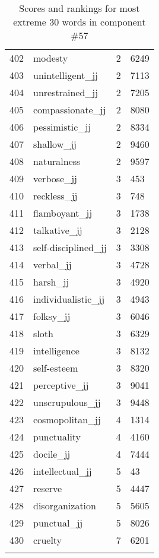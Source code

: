 \begin{longtable}[!htbp]{| rlr@{.}l |}
    402 & modesty & 2 & 6249 \\
    403 & unintelligent\_jj & 2 & 7113 \\
    404 & unrestrained\_jj & 2 & 7205 \\
    405 & compassionate\_jj & 2 & 8080 \\
    406 & pessimistic\_jj & 2 & 8334 \\
    407 & shallow\_jj & 2 & 9460 \\
    408 & naturalness & 2 & 9597 \\
    409 & verbose\_jj & 3 & 453 \\
    410 & reckless\_jj & 3 & 748 \\
    411 & flamboyant\_jj & 3 & 1738 \\
    412 & talkative\_jj & 3 & 2128 \\
    413 & self-disciplined\_jj & 3 & 3308 \\
    414 & verbal\_jj & 3 & 4728 \\
    415 & harsh\_jj & 3 & 4920 \\
    416 & individualistic\_jj & 3 & 4943 \\
    417 & folksy\_jj & 3 & 6046 \\
    418 & sloth & 3 & 6329 \\
    419 & intelligence & 3 & 8132 \\
    420 & self-esteem & 3 & 8320 \\
    421 & perceptive\_jj & 3 & 9041 \\
    422 & unscrupulous\_jj & 3 & 9448 \\
    423 & cosmopolitan\_jj & 4 & 1314 \\
    424 & punctuality & 4 & 4160 \\
    425 & docile\_jj & 4 & 7444 \\
    426 & intellectual\_jj & 5 & 43 \\
    427 & reserve & 5 & 4447 \\
    428 & disorganization & 5 & 5605 \\
    429 & punctual\_jj & 5 & 8026 \\
    430 & cruelty & 7 & 6201 \\
    \hline
    \caption{Scores and rankings for most extreme 30 words in component \#57} \\
\end{longtable}
